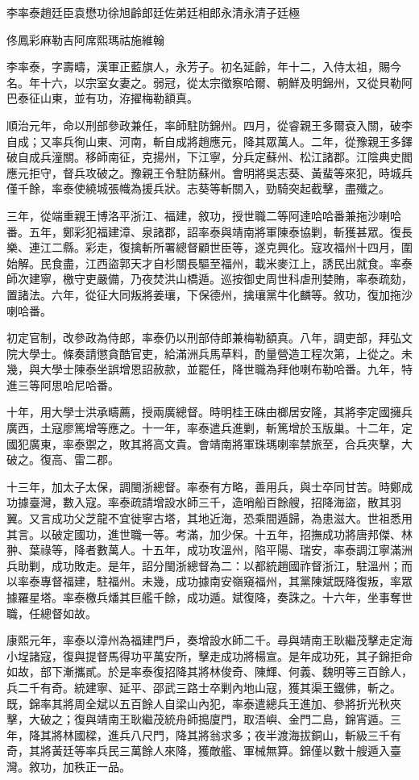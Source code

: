 
\begin{pinyinscope}
李率泰趙廷臣袁懋功徐旭齡郎廷佐弟廷相郎永清永清子廷極

佟鳳彩麻勒吉阿席熙瑪祜施維翰

李率泰，字壽疇，漢軍正藍旗人，永芳子。初名延齡，年十二，入侍太祖，賜今名。年十六，以宗室女妻之。弱冠，從太宗徵察哈爾、朝鮮及明錦州，又從貝勒阿巴泰征山東，並有功，洊擢梅勒額真。

順治元年，命以刑部參政兼任，率師駐防錦州。四月，從睿親王多爾袞入關，破李自成；又率兵徇山東、河南，斬自成將趙應元，降其眾萬人。二年，從豫親王多鐸破自成兵潼關。移師南征，克揚州，下江寧，分兵定蘇州、松江諸郡。江陰典史閻應元拒守，督兵攻破之。豫親王令駐防蘇州。會明將吳志葵、黃蜚等來犯，時城兵僅千餘，率泰使繞城張幟為援兵狀。志葵等斬關入，勁騎突起截擊，盡殲之。

三年，從端重親王博洛平浙江、福建，敘功，授世職二等阿達哈哈番兼拖沙喇哈番。五年，鄭彩犯福建漳、泉諸郡，詔率泰與靖南將軍陳泰協剿，斬獲甚眾。復長樂、連江二縣。彩走，復擒斬所署總督顧世臣等，遂克興化。寇攻福州十四月，圍始解。民食盡，江西盜郭天才自杉關長驅至福州，載米麥江上，誘民出就食。率泰師次建寧，檄守吏嚴備，乃夜焚洪山橋遁。巡按御史周世科虐刑婪賄，率泰疏劾，置諸法。六年，從征大同叛將姜瓖，下保德州，擒瓖黨牛化麟等。敘功，復加拖沙喇哈番。

初定官制，改參政為侍郎，率泰仍以刑部侍郎兼梅勒額真。八年，調吏部，拜弘文院大學士。條奏請懲貪酷官吏，給滿洲兵馬草料，酌量營造工程次第，上從之。未幾，與大學士陳泰坐誤增恩詔赦款，並罷任，降世職為拜他喇布勒哈番。九年，特進三等阿思哈尼哈番。

十年，用大學士洪承疇薦，授兩廣總督。時明桂王硃由榔居安隆，其將李定國擁兵廣西，土寇廖篤增等應之。十一年，率泰遣兵進剿，斬篤增於玉版巢。十二年，定國犯廣東，率泰禦之，敗其將高文貴。會靖南將軍珠瑪喇率禁旅至，合兵夾擊，大破之。復高、雷二郡。

十三年，加太子太保，調閩浙總督。率泰有方略，善用兵，與士卒同甘苦。時鄭成功據臺灣，數入寇。率泰疏請增設水師三千，造哨船百餘艘，招降海盜，散其羽翼。又言成功父芝龍不宜徙寧古塔，其地近海，恐乘間遁歸，為患滋大。世祖悉用其言。以破定國功，進世職一等。考滿，加少保。十五年，招撫成功將唐邦傑、林翀、葉祿等，降者數萬人。十五年，成功攻溫州，陷平陽、瑞安，率泰調江寧滿洲兵助剿，成功敗走。是年，詔分閩浙總督為二：以都統趙國祚督浙江，駐溫州；而以率泰專督福建，駐福州。未幾，成功據南安嶺窺福州，其黨陳斌既降復叛，率眾據羅星塔。率泰檄兵燔其巨艦千餘，成功遁。斌復降，奏誅之。十六年，坐事奪世職，任總督如故。

康熙元年，率泰以漳州為福建門戶，奏增設水師二千。尋與靖南王耿繼茂擊走定海小埕諸寇，復與提督馬得功平萬安所，擊走成功將楊宣。是年成功死，其子錦拒命如故，部下漸攜貳。於是率泰復招降其將林俊奇、陳輝、何義、魏明等三百餘人，兵二千有奇。統建寧、延平、邵武三路士卒剿內地山寇，獲其渠王鐵佛，斬之。既，錦率其將周全斌以五百餘人自梁山內犯，率泰遣總兵王進加、參將折光秋夾擊，大破之；復與靖南王耿繼茂統舟師搗廈門，取浯嶼、金門二島，錦宵遁。三年，降其將林國樑，進兵八尺門，降其將翁求多；夜半渡海拔銅山，斬級三千有奇，其將黃廷等率兵民三萬餘人來降，獲敵艦、軍械無算。錦僅以數十艘遁入臺灣。敘功，加秩正一品。


\end{pinyinscope}

